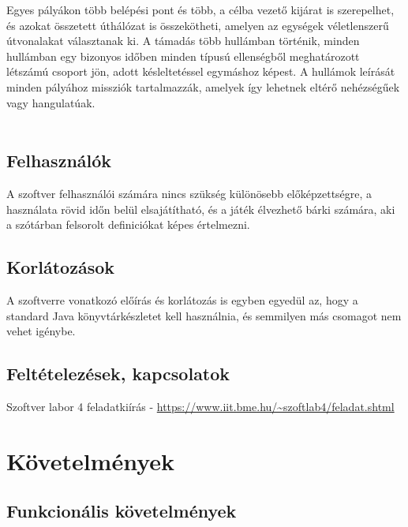 Egyes pályákon több belépési pont és több, a célba vezető kijárat is szerepelhet, és azokat összetett úthálózat is összekötheti, amelyen az egységek véletlenszerű útvonalakat választanak ki.
A támadás több hullámban történik, minden hullámban egy bizonyos időben minden típusú ellenségből meghatározott létszámú csoport jön, adott késleltetéssel egymáshoz képest. A hullámok leírását minden pályához missziók tartalmazzák, amelyek így lehetnek eltérő nehézségűek vagy hangulatúak. \\ \\

\subsection{Felhasználók}
A szoftver felhasználói számára nincs szükség különösebb előképzettségre, a használata rövid időn belül elsajátítható, és a játék élvezhető bárki számára, aki a szótárban felsorolt definiciókat képes értelmezni.

\subsection{Korlátozások}
A szoftverre vonatkozó előírás és korlátozás is egyben egyedül az, hogy a standard Java könyvtárkészletet kell használnia, és semmilyen más csomagot nem vehet igénybe.

\subsection{Feltételezések, kapcsolatok}
Szoftver labor 4 feladatkiírás - \url{https://www.iit.bme.hu/~szoftlab4/feladat.shtml}

\section{Követelmények}
\subsection{Funkcionális követelmények}


